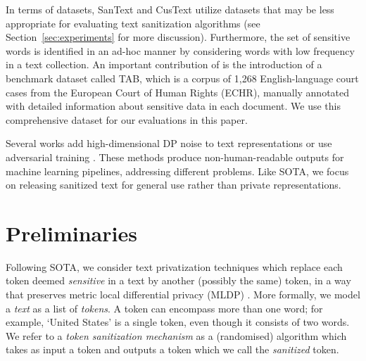 \documentclass[11pt]{article}
\begin{document}
In terms of datasets, SanText and CusText utilize datasets that may be less appropriate for evaluating text sanitization algorithms (see Section~\ref{sec:experiments} for more discussion). 
Furthermore, the set of sensitive words is identified in an ad-hoc manner by considering words with low frequency in a text collection.
An important contribution of \cite{pilan2022text} is the introduction of a benchmark dataset called TAB, which is a corpus of 1,268 English-language court cases from the European Court of Human Rights (ECHR), manually annotated with detailed information about sensitive data in each document.
We use this comprehensive dataset for our evaluations in this paper. 



Several works add high-dimensional DP noise to text representations \cite{feyisetan2019leveraging, feyisetan2020privacy, lyu2020differentially, lyu2020towards} or use adversarial training \cite{xie2017controllable, coavoux2018privacy, elazar2018adversarial, li2018towards}. 
These methods produce non-human-readable outputs for machine learning pipelines, addressing different problems. Like SOTA, we focus on releasing sanitized text for general use rather than private representations.


\section{Preliminaries}
\label{sec:prelim}


Following SOTA, we consider text privatization techniques which replace each token deemed {\em sensitive} in a text by another (possibly the same) token, in a way that preserves metric local differential privacy (MLDP) \cite{alvim2018local}. 
More formally, we model a {\em text} as a list of {\em tokens}.  
A token can encompass more than one word; for example, `United States' is a single token, even though it consists of two words. 
We refer to a {\em token sanitization mechanism} as a (randomised) algorithm which takes as input a token and outputs a token which we call the {\em sanitized} token.
\end{document}
